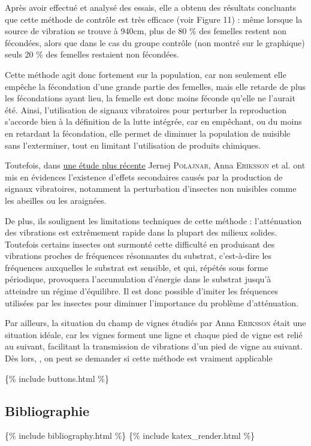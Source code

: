 Après avoir effectué et analysé des essais, elle a obtenu des résultats
concluants que cette méthode de contrôle est très efficace (voir Figure
11) : même lorsque la source de vibration se trouve à 940cm, plus de 80
\% des femelles restent non fécondées, alors que dans le cas du groupe
contrôle (non montré sur le graphique) seuls 20 \% des femelles
restaient non fécondées.

Cette méthode agit donc fortement sur la population, car non seulement
elle empêche la fécondation d'une grande partie des femelles, mais elle
retarde de plus les fécondations ayant lieu, la femelle est donc moins
féconde qu'elle ne l'aurait été. Ainsi, l'utilisation de signaux
vibratoires pour perturber la reproduction s'accorde bien à la
définition de la lutte intégrée, car en empêchant, ou du moins en
retardant la fécondation, elle permet de diminuer la population de
nuisible sans l'exterminer, tout en limitant l'utilisation de produits
chimiques.

Toutefois, dans
\href{http://onlinelibrary.wiley.com/enhanced/doi/10.1002/ps.3848}{une
étude plus récente} Jernej \textsc{Polajnar}, Anna \textsc{Eriksson} et
al. ont mis en évidences l'existence d'effets secondaires causés par la
production de signaux vibratoires, notamment la perturbation d'insectes
non nuisibles comme les abeilles ou les araignées.

De plus, ils soulignent les limitations techniques de cette méthode :
l'atténuation des vibrations est extrêmement rapide dans la plupart des
milieux solides. Toutefois certains insectes ont surmonté cette
difficulté en produisant des vibrations proches de fréquences
résonnantes du substrat, c'est-à-dire les fréquences auxquelles le
substrat est sensible, et qui, répétés sous forme périodique, provoquera
l'accumulation d'énergie dans le substrat jusqu'à atteindre un régime
d'équilibre. Il est donc possible d'imiter les fréquences utilisées par
les insectes pour diminuer l'importance du problème d'atténuation.

Par ailleurs, la situation du champ de vignes étudiés par Anna
\textsc{Eriksson} était une situation idéale, car les vignes forment une
ligne et chaque pied de vigne est relié au suivant, facilitant la
transmission de vibrations d'un pied de vigne au suivant. Dès lors, , on
peut se demander si cette méthode est vraiment applicable

\{\% include buttons.html \%\}

\subsection{Bibliographie}\label{bibliographie}

\{\% include bibliography.html \%\} \{\% include katex\_render.html \%\}

